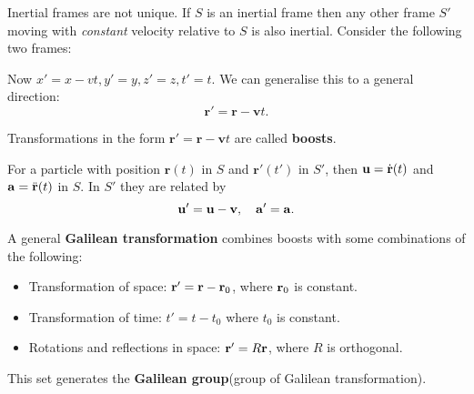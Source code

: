 \begin{note}
    Inertial frames are not unique. If $S$ is an inertial frame then any other frame $S'$ moving with \textit{constant} velocity relative to $S$ is also inertial. Consider the following two frames:
    \begin{center}
    \end{center}
    Now $ x'=x-vt, y'=y, z'=z, t'=t $. We can generalise this to a general direction: 
    \[
        \mathbf{r}'=\mathbf{r}-\mathbf{v}t.
    \]
\end{note}
\begin{definition}[Boosts]
    Transformations in the form $\mathbf{r}'=\mathbf{r}-\mathbf{v}t$ are called \textbf{boosts}.
\end{definition}

For a particle with position $ \mathbf{r}(t) $ in $S$ and $ \mathbf{r}'(t') $ in $S'$, then ${\bf u}=\dot{{\bf r}}(t)$ and $ {\bf a}=\ddot{{\bf r}}(t) $ in $S$. In $S'$ they are related by 
\[
    {\bf u}' = {\bf u}-{\bf v},\quad {\bf a}'={\bf a}.
\] 

\begin{definition}
    A general \textbf{Galilean transformation} combines boosts with some combinations of the following: 
    \begin{itemize}
        \item Transformation of space: $ {\bf r}'={\bf r}-{\bf r}_0 $, where ${\bf r}_0$ is constant.
        \item Transformation of time: $ t'=t-t_0 $ where $t_0$ is constant.
        \item Rotations and reflections in space: $ {\bf r}'=R{\bf r} $, where $R$ is orthogonal.
    \end{itemize}
    This set generates the \textbf{Galilean group}(group of Galilean transformation).
\end{definition}

